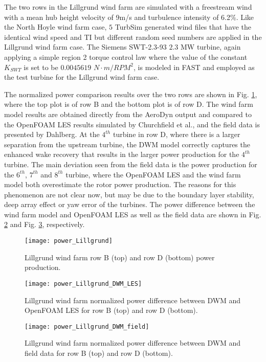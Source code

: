 \documentclass{umthesis}
\begin{document}
The two rows in the Lillgrund wind farm are simulated with a freestream wind with a mean hub height velocity of 9m/s and turbulence intensity of 6.2\%. Like the North Hoyle wind farm case, $5$ TurbSim generated wind files that have the identical wind speed and TI but different random seed numbers are applied in the Lillgrund wind farm case. The Siemens SWT-2.3-93 $2.3$ MW turbine, again applying a simple region 2 torque control law where the value of the constant $K_{SWT}$ is set to be $0.0045619$ $N\cdot m/RPM^2$, is modeled in FAST and employed as the test turbine for the Lillgrund wind farm case.

The normalized power comparison results over the two rows are shown in Fig. \ref{fig:power_Lillgrund}, where the top plot is of row B and the bottom plot is of row D. The wind farm model results are obtained directly from the AeroDyn output and compared to the OpenFOAM LES results simulated by Churchfield et al., and the field data is presented by Dahlberg\cite{Churchfield_LES}. At the $4^{th}$ turbine in row D, where there is a larger separation from the upstream turbine, the DWM model correctly captures the enhanced wake recovery that results in the larger power production for the $4^{th}$ turbine. The main deviation seen from the field data is the power production for the $6^{th}$, $7^{th}$ and $8^{th}$ turbine, where the OpenFOAM LES and the wind farm model both overestimate the rotor power production. The reasons for this phenomenon are not clear now, but may be due to the boundary layer stability, deep array effect or yaw error of the turbines. The power difference between the wind farm model and OpenFOAM LES as well as the field data are shown in Fig. \ref{fig:power_Lillgrund_DWM_LES} and Fig. \ref{fig:power_Lillgrund_DWM_field}, respectively.
\begin{figure}
  \centering
  \texttt{[image: power\_Lillgrund]}
  \caption{Lillgrund wind farm row B (top) and row D (bottom) power production.}\label{fig:power_Lillgrund}
\end{figure}
\begin{figure}
  \centering
  \texttt{[image: power\_Lillgrund\_DWM\_LES]}
  \caption{Lillgrund wind farm normalized power difference between DWM and OpenFOAM LES for row B (top) and row D (bottom).}\label{fig:power_Lillgrund_DWM_LES}
\end{figure}
\begin{figure}
  \centering
  \texttt{[image: power\_Lillgrund\_DWM\_field]}
  \caption{ Lillgrund wind farm normalized power difference between DWM and field data for row B (top) and row D (bottom).}\label{fig:power_Lillgrund_DWM_field}
\end{figure}
\end{document}
